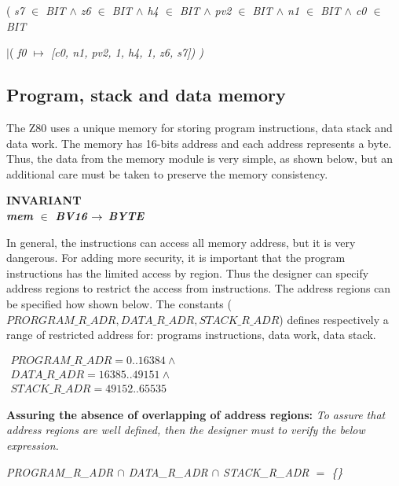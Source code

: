\documentclass[11pt]{article} %
\begin{document}
\rm ( \it s7 $\in$ \it BIT $\land$ \it z6 $\in$ \it BIT $\land$ \it h4 $\in$ \it
BIT $\land$ \it pv2 $\in$ \it BIT $\land$ \it n1 $\in$ \it BIT $\land$ \it c0 $\in$ \it BIT
  
\hspace*{0.20in}\rm $\mid$( \it f0  $\mapsto$  \rm \rm [\it c0\rm , \it n1\rm , \it pv2\rm , \rm 1\rm , \it
h4\rm , \rm 1\rm , \it z6\rm , \it s7\rm \rm ]\rm ) \rm )


\subsection{Program, stack and data memory}

The Z80 uses a unique memory for storing program instructions, data stack and
data work. The memory has 16-bits address and each address represents a byte.
Thus, the data from the memory module is very simple, as shown below, but an
additional care must be taken to preserve the memory consistency.

\begin{sloppypar}
\bf INVARIANT \\
\hspace*{0.10in}\it mem  $\in$  \it BV16  $\rightarrow$  \it BYTE 

\end{sloppypar}
  
In general, the instructions can access all memory address, but it is very
dangerous. For adding more security, it is important that the program
instructions has the limited access by region. Thus the designer can specify
address regions to restrict the access from instructions. The address regions can
be specified how shown below. The constants
($\mathit{PRORGRAM\_R\_ADR,DATA\_R\_ADR,STACK\_R\_ADR}$) defines respectively a
range of restricted address for: programs instructions, data work, data stack.

$
\begin{array}{l}
\mathit{PROGRAM\_R\_ADR} = 0..16384 \land\\
\mathit{DATA\_R\_ADR} = 16385..49151 \land\\
\mathit{STACK\_R\_ADR} = 49152..65535
\end{array}
$

\textbf{Assuring the absence of overlapping of address regions:}
 \emph{To assure that address regions are well defined, then the designer must to verify the below expression.}

\begin{sloppypar}
\hspace*{0.10in}\it PROGRAM\_R\_ADR $\cap$ DATA\_R\_ADR $\cap$  STACK\_R\_ADR $=$ \{\}
\end{sloppypar}
 
\end{document}
